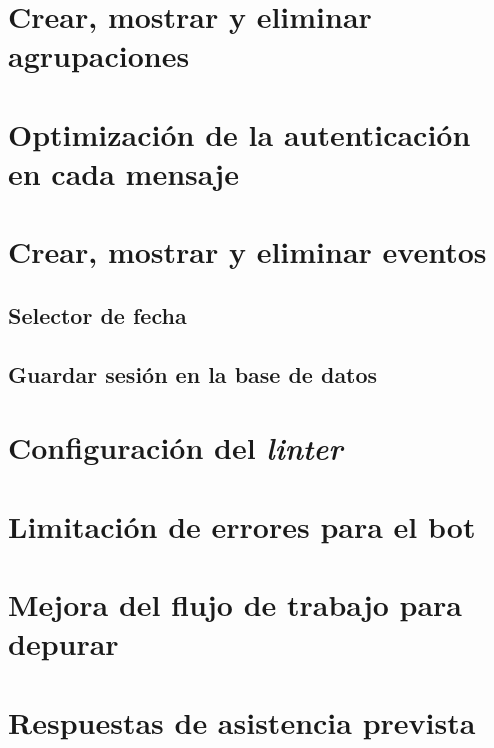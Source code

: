 \section{Crear, mostrar y eliminar agrupaciones}



\section{Optimización de la autenticación en cada mensaje}



\section{Crear, mostrar y eliminar eventos}


\subsection{Selector de fecha}


\subsection{Guardar sesión en la base de datos}





\section{Configuración del \textit{linter}}



\section{Limitación de errores para el bot}


\section{Mejora del flujo de trabajo para depurar}


\section{Respuestas de asistencia prevista}


